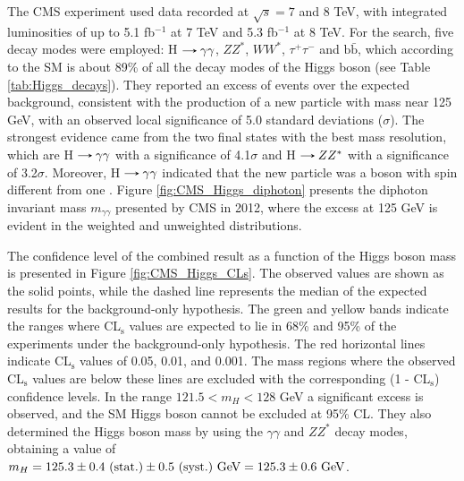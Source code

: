 The CMS experiment used data recorded at $\sqrt{s} = 7$ and 8 TeV, with integrated luminosities of up to 5.1 fb$^{-1}$ at 7 TeV and 5.3 fb$^{-1}$ at 8 TeV. For the search, five decay modes were employed: H$\decaysto\gamma\gamma$, $ZZ^*$, $WW^*$, $\tau^+\tau^-$ and $\text{b}\bar{\text{b}}$, which according to the SM is about 89\% of all the decay modes of the Higgs boson (see Table \ref{tab:Higgs_decays}). They reported an excess of events over the expected background, consistent with the production of a new particle with mass near 125 GeV, with an observed local significance of 5.0 standard deviations ($\sigma$). The strongest evidence came from the two final states with the best mass resolution, which are H$\decaysto\gamma\gamma$ with a significance of 4.1$\sigma$ and H$\decaysto ZZ^*$ with a significance of 3.2$\sigma$. Moreover, H$\decaysto\gamma\gamma$ indicated that the new particle was a boson with spin different from one \cite{CMS:2012qbp}. Figure \ref{fig:CMS_Higgs_diphoton} presents the diphoton invariant mass $m_{\gamma\gamma}$ presented by CMS in 2012, where the excess at 125 GeV is evident in the weighted and unweighted distributions.

The confidence level of the combined result as a function of the Higgs boson mass is presented in Figure \ref{fig:CMS_Higgs_CLs}. The observed values are shown as the solid points, while the dashed line represents the median of the expected results for the background-only hypothesis. The green and yellow bands indicate the ranges where CL$_\text{s}$ values are expected to lie in 68\% and 95\% of the experiments under the background-only hypothesis. The red horizontal lines indicate CL$_\text{s}$ values of 0.05, 0.01, and 0.001. The mass regions where the observed CL$_\text{s}$ values are below these lines are excluded with the corresponding (1 - CL$_\text{s}$) confidence levels. In the range $121.5 < m_H < 128$ GeV a significant excess is observed, and the SM Higgs boson cannot be excluded at 95\% CL. They also determined the Higgs boson mass by using the $\gamma\gamma$ and $ZZ^*$ decay modes, obtaining a value of $m_H=125.3\pm0.4\text{ (stat.)}\pm0.5\text{ (syst.)}\ \text{GeV} = 125.3\pm0.6\ \text{GeV}$.

